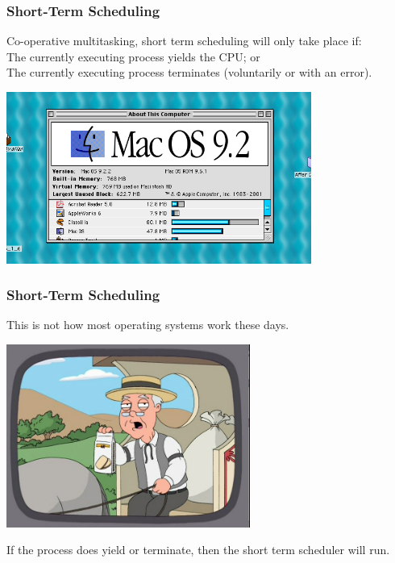 \begin{frame}
\frametitle{Short-Term Scheduling}

Co-operative multitasking, short term scheduling will only take place if:\\
\quad The currently executing process yields the CPU; or\\
\quad The currently executing process terminates (voluntarily or with an error). 

\begin{center}
	\includegraphics[width=0.75\textwidth]{images/macos9.png}
\end{center}

\end{frame}

\begin{frame}
\frametitle{Short-Term Scheduling}

This is not how most operating systems work these days. 

\begin{center}
	\includegraphics[width=0.6\textwidth]{images/remembers.jpg}
\end{center}


If the process does yield or terminate, then the short term scheduler will run.

\end{frame}

